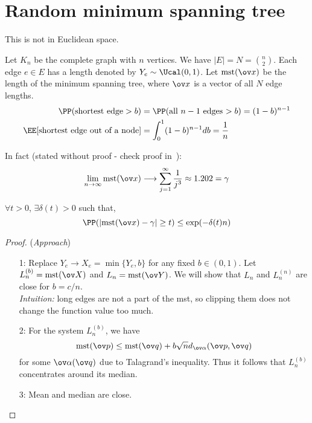 \section{Random minimum spanning tree}
\begin{note}
This is not in Euclidean space.
\end{note}
Let $K_n$ be the complete graph with $n$ vertices. We have $|E| = N = \binom n2$. Each edge $e \in E$ has a length denoted by $Y_e \sim \Ucal(0,1)$. Let $\mst(\ov x)$ be the length of the minimum spanning tree, where $\ov x$ is a vector of all $N$ edge lengths.
\begin{align*}
    \PP(\text{shortest edge} > b) &= \PP(\text{all $n-1$ edges $> b$}) = (1-b)^{n-1} \\
    \EE[\text{shortest edge out of a node}] &= \int_0^1 (1-b)^{n-1} db = \frac{1}{n}
\end{align*}
\begin{remark}
In fact (stated without proof - check proof in~\cite{mcdiarmid1998concentration}):
\[
\lim_{n\to\infty} \mst(\ov x) \longrightarrow \sum_{j=1}^{\infty} \frac{1}{j^3} \approx 1.202 = \gamma
\]
\end{remark}
\begin{theorem}
$\forall t > 0$, $\exists \delta (t) > 0$ such that,
\begin{equation}
    \PP(|\mst(\ov x) - \gamma| \geq t) \leq \exp(-\delta (t) n)
\end{equation}
\end{theorem}
\begin{proof}(\textit{Approach})
\begin{itemize}
    \item[1:] Replace $Y_e \to X_e=\min\{Y_e, b\}$ for any fixed $b \in (0,1)$. Let $L_n^{(b)} = \mst(\ov X)$ and $L_n = \mst(\ov Y)$. We will show that $L_n$ and $L_n^{(n)}$ are close for $b = c/n$.\\
    \textit{Intuition:} long edges are not a part of the mst, so clipping them does not change the function value too much.
    \item[2:] For the system $L_n^{(b)}$, we have
    \[
    \mst(\ov p) \leq \mst(\ov q) + b\sqrt{n}d_{\ov\alpha}(\ov p,\ov q)
    \]
    for some $\ov\alpha(\ov q)$ due to Talagrand's inequality. Thus it follows that $L_n^{(b)}$ concentrates around its median.
    \item[3:] Mean and median are close.
\end{itemize}
\end{proof}